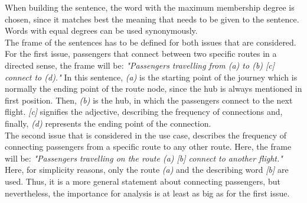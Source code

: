 \documentclass[conference]{IEEEtran}
\begin{document}
When building the sentence, the word with the maximum membership degree is chosen, since it matches best the meaning that needs to be given to the sentence. Words with equal degrees can be used synonymously.\\
The frame of the sentences has to be defined for both issues that are considered. For the first issue, passengers that connect between two specific routes in a directed sense, the frame will be: \newline \emph{"Passengers travelling from (a) to (b) [c] connect to (d)."} \newline In this sentence, \emph{(a)} is the starting point of the journey which is normally the ending point of the route node, since the hub is always mentioned in first position. Then, \emph{(b)} is the hub, in which the passengers connect to the next flight. \emph{[c]} signifies the adjective, describing the frequency of connections and, finally, \emph{(d)} represents the ending point of the connection.\\
The second issue that is considered in the use case, describes the frequency of connecting passengers from a specific route to any other route. Here, the frame will be: \newline \emph{"Passengers travelling on the route (a) [b] connect to another flight."} \newline Here, for simplicity reasons, only the route \emph{(a)} and the describing word \emph{[b]} are used. Thus, it is a more general statement about connecting passengers, but nevertheless, the importance for analysis is at least as big as for the first issue.
\end{document}
